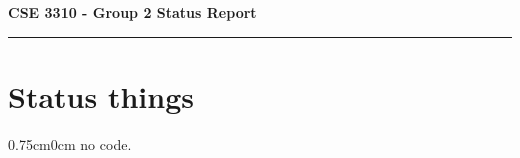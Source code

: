\documentclass[10pt,letterpaper]{article}
\newcommand{\indentleft}{0.75cm}
\newcommand{\indentright}{0cm}
\newcommand{\postsubhead}{-1.0em}
\newcommand{\postsection}{-1.5em}
\begin{document}
\raggedright

  {\Huge\textbf{CSE 3310 - Group 2 Status Report}}
  \vspace*{0pt}
  \hrule

  \section*{Status things}
    \vspace{\postsubhead}
    \begin{adjustwidth}{\indentleft}{\indentright}
    no code.

    \vspace{\postsection}
    \end{adjustwidth}


\begin{comment}
	


\end{comment}
\end{document}
